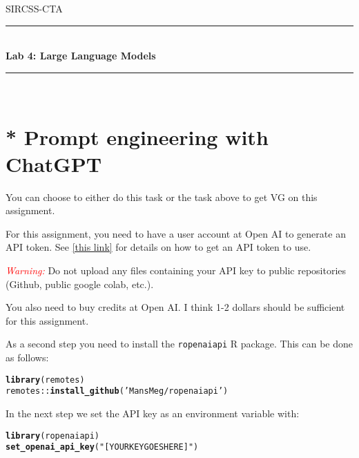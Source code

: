 \documentclass[11pt,a4paper,english]{article}\usepackage[]{graphicx}\usepackage[]{xcolor}
\makeatletter
\newcommand{\hlstr}[1]{\textcolor[rgb]{0.192,0.494,0.8}{#1}}%
\newcommand{\hlopt}[1]{\textcolor[rgb]{0,0,0}{#1}}%
\newcommand{\hlstd}[1]{\textcolor[rgb]{0.345,0.345,0.345}{#1}}%
\newcommand{\hlkwd}[1]{\textcolor[rgb]{0.737,0.353,0.396}{\textbf{#1}}}%
\newenvironment{kframe}{%
 \def\at@end@of@kframe{}%
 \ifinner\ifhmode%
  \def\at@end@of@kframe{\end{minipage}}%
  \begin{minipage}{\columnwidth}%
 \fi\fi%
 \def\FrameCommand##1{\hskip\@totalleftmargin \hskip-\fboxsep
 \colorbox{shadecolor}{##1}\hskip-\fboxsep
     \hskip-\linewidth \hskip-\@totalleftmargin \hskip\columnwidth}%
 \MakeFramed {\advance\hsize-\width
   \@totalleftmargin\z@ \linewidth\hsize
   \@setminipage}}%
 {\par\unskip\endMakeFramed%
 \at@end@of@kframe}
\newenvironment{knitrout}{}{} %
\newcommand{\HRule}{\rule{\linewidth}{0.5mm}}
\makeatother
\begin{document}

\begin{titlepage}

\center
\textsc{\LARGE SIRCSS-CTA}\\[1.5cm] %

\HRule \\[0.4cm]
{ \huge \bfseries Lab 4: Large Language Models}\\[0.4cm] %
\HRule \\[1.5cm]

\vfill

\end{titlepage}





\section{* Prompt engineering with ChatGPT}

You can choose to either do this task or the task above to get VG on this assignment.



For this assignment, you need to have a user account at Open AI to generate an API token. See \href{https://help.openai.com/en/articles/4936850-where-do-i-find-my-api-key}{[this link]} for details on how to get an API token to use.

\textcolor{red}{\emph{Warning:}} Do not upload any files containing your API key to public repositories (Github, public google colab, etc.).

You also need to buy credits at Open AI. I think 1-2 dollars should be sufficient for this assignment.

As a second step you need to install the \texttt{ropenaiapi} R package. This can be done as follows:
\begin{knitrout}\small
{}\color{fgcolor}\begin{kframe}
\begin{alltt}
\hlkwd{library}\hlstd{(remotes)}
\hlstd{remotes}\hlopt{::}\hlkwd{install_github}\hlstd{(}\hlstr{'MansMeg/ropenaiapi'}\hlstd{)}
\end{alltt}
\end{kframe}
\end{knitrout}
In the next step we set the API key as an environment variable with:
\begin{knitrout}\small
{}\color{fgcolor}\begin{kframe}
\begin{alltt}
\hlkwd{library}\hlstd{(ropenaiapi)}
\hlkwd{set_openai_api_key}\hlstd{(}\hlstr{"[YOUR KEY GOES HERE]"}\hlstd{)}
\end{alltt}
\end{kframe}
\end{knitrout}
\end{document}
